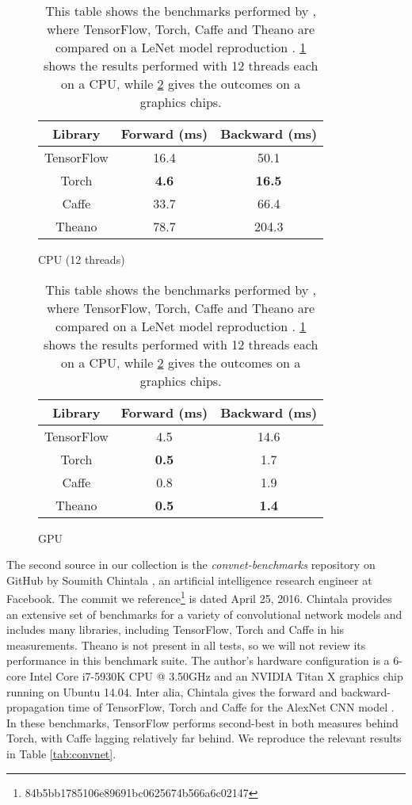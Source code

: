 \begin{table}
  \begin{subfigure}[h]{0.49\textwidth}
    \centering
    \begin{tabular}{ccc}
      \textbf{Library} & \textbf{Forward (ms)} & \textbf{Backward (ms)}
      \\ \toprule
      TensorFlow & 16.4 & 50.1
      \\
      Torch & \textbf{4.6} & \textbf{16.5}
      \\
      Caffe & 33.7 & 66.4
      \\
      Theano & 78.7 & 204.3
      \\ \bottomrule
    \end{tabular}
    \caption{CPU (12 threads)}
  \label{tab:bosch-a}
  \end{subfigure}

  \vspace{0.5cm}

  \begin{subfigure}[h]{0.49\textwidth}
    \centering
    \begin{tabular}{ccc}
      \textbf{Library} & \textbf{Forward (ms)} & \textbf{Backward (ms)}
      \\ \toprule
      TensorFlow & 4.5 & 14.6
      \\
      Torch & \textbf{0.5} & 1.7
      \\
      Caffe & 0.8 & 1.9
      \\
      Theano & \textbf{0.5} & \textbf{1.4}
      \\ \bottomrule
    \end{tabular}
    \caption{GPU}
    \label{tab:bosch-b}
  \end{subfigure}
  \caption{This table shows the benchmarks performed by \cite{bosch}, where
    TensorFlow, Torch, Caffe and Theano are compared on a LeNet model
    reproduction \cite{lenet}. \ref{tab:bosch-a} shows the results performed
    with 12 threads each on a CPU, while \ref{tab:bosch-b} gives the outcomes on
    a graphics chips.}
  \label{tab:bosch}
\end{table}

The second source in our collection is the \emph{convnet-benchmarks} repository
on GitHub by Soumith Chintala \cite{convnet-bench}, an artificial intelligence
research engineer at Facebook. The commit we
reference\footnote{84b5bb1785106e89691bc0625674b566a6c02147} is dated April 25,
2016. Chintala provides an extensive set of benchmarks for a variety of
convolutional network models and includes many libraries, including TensorFlow,
Torch and Caffe in his measurements. Theano is not present in all tests, so we
will not review its performance in this benchmark suite. The author's hardware
configuration is a 6-core Intel Core i7-5930K CPU @ 3.50GHz and an NVIDIA Titan
X graphics chip running on Ubuntu 14.04. Inter alia, Chintala gives the forward
and backward-propagation time of TensorFlow, Torch and Caffe for the AlexNet CNN
model \cite{alexnet}. In these benchmarks, TensorFlow performs second-best in
both measures behind Torch, with Caffe lagging relatively far behind. We
reproduce the relevant results in Table \ref{tab:convnet}.

